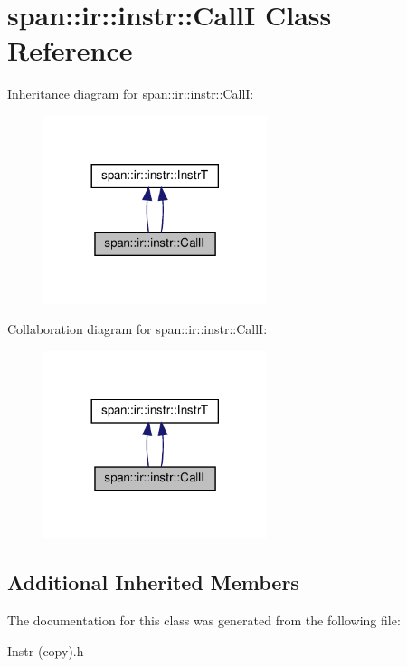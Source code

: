 \hypertarget{classspan_1_1ir_1_1instr_1_1CallI}{}\section{span\+:\+:ir\+:\+:instr\+:\+:CallI Class Reference}
\label{classspan_1_1ir_1_1instr_1_1CallI}


Inheritance diagram for span\+:\+:ir\+:\+:instr\+:\+:CallI\+:\nopagebreak
\begin{figure}[H]
\begin{center}
\leavevmode
\includegraphics[width=185pt]{classspan_1_1ir_1_1instr_1_1CallI__inherit__graph}
\end{center}
\end{figure}


Collaboration diagram for span\+:\+:ir\+:\+:instr\+:\+:CallI\+:\nopagebreak
\begin{figure}[H]
\begin{center}
\leavevmode
\includegraphics[width=185pt]{classspan_1_1ir_1_1instr_1_1CallI__coll__graph}
\end{center}
\end{figure}
\subsection*{Additional Inherited Members}


The documentation for this class was generated from the following file\+:\begin{DoxyCompactItemize}
\item 
Instr (copy).\+h\end{DoxyCompactItemize}
